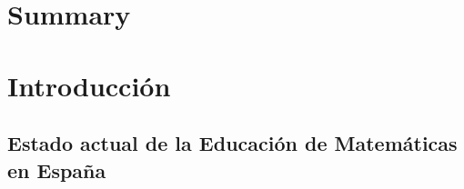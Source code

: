 \documentclass[a4paper, 12pt]{book}
\newif\iftocs
\begin{document}
\chapter*{Summary}

\cleardoublepage




\tableofcontents 


\cleardoublepage

\iftocs
\addcontentsline{toc}{chapter}{Lista de figuras.}%
\else
\fi

\listoffigures %



\cleardoublepage

\iftocs
\addcontentsline{toc}{chapter}{Lista de tablas}%
\else
\fi
\listoftables %

\iftocs
\addcontentsline{toc}{chapter}{Acrónimos}%
\else
\fi

 
\printglossary[title=Glosario,toctitle=Glosario]
\printglossary[title=Acrónimos,toctitle=Acrónimos,type=\acronymtype]



\cleardoublepage
{} %
\chapter{Introducción}
\label{chap:intro} %


\section{Estado actual de la Educación de Matemáticas en España}
\label{sec:EstadoEducacionMates}
\end{document}

